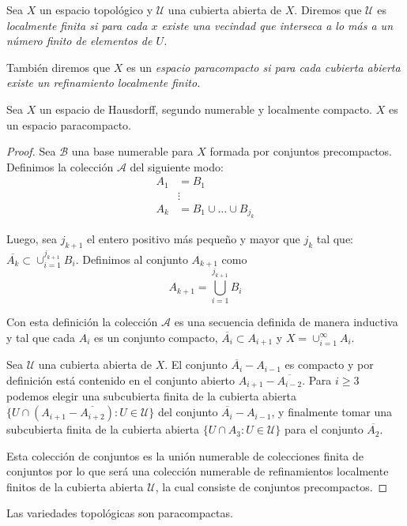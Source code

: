 \begin{definition}
  Sea $X$ un espacio topológico y $\mathcal{U}$ una cubierta abierta de $X$. Diremos que $\mathcal{U}$  es \it{localmente finita} si para cada $x$ existe una vecindad que interseca a lo más a un número finito de elementos de $U$.

  También diremos que $X$ es un \it{espacio paracompacto} si para cada cubierta abierta existe un refinamiento localmente finito. 
\end{definition}

\begin{theorem}  \label{Teorema: Espacios Precompactos}
 Sea $X$ un espacio de Hausdorff, segundo numerable y localmente compacto. $X$ es un espacio paracompacto.
\end{theorem}

\begin{proof}
  Sea $\mathcal{B}$ una base numerable para $X$ formada por conjuntos precompactos. Definimos la colección $\mathcal{A}$ del siguiente modo:
  \begin{align*}
    A_1 &= B_1\\
    &\vdots\\
    A_k &= B_1 \cup \dots \cup B_{j_k}
  \end{align*}

  Luego, sea $j_{k+1}$ el entero positivo más pequeño y mayor que $j_k$ tal que: $\overline{A_k} \subset \cup_{i=1}^{j_{k+1}} B_i$. Definimos al conjunto $A_{k+1}$ como
  \[
    A_{k+1} = \bigcup_{i=1}^{j_{k+1}} B_i
  \]

  Con esta definición la colección $\mathcal{A}$ es una secuencia definida de manera inductiva y tal que cada $A_i$ es un conjunto compacto, $\overline{A_i} \subset A_{i+1}$ y $X = \cup_{i=1}^{\infty} A_i$.

  Sea $\mathcal{U}$ una cubierta abierta de $X$. El conjunto $\overline{A_i} - A_{i-1}$ es compacto y por definición está contenido en el conjunto abierto $A_{i+1} - \overline{A_{i-2}}$. Para $i \geq 3$ podemos elegir una subcubierta finita de la cubierta abierta $\{U \cap (A_{i+1} - \overline{A_{i+2}}) : U \in \mathcal{U} \}$ del conjunto $\overline{A_{i}} - A_{i-1}$, y finalmente tomar una subcubierta finita de la cubierta abierta $\{U \cap A_3: U \in \mathcal{U}\}$ para el conjunto $\overline{A_2}$.

Esta colección de conjuntos es la unión numerable de colecciones finita de conjuntos por lo que será una colección numerable de refinamientos localmente finitos de la cubierta abierta $\mathcal{U}$, la cual consiste de conjuntos precompactos.
\end{proof}

\begin{corollary} \label{Corolario: Variedades Precompactas}
  Las variedades topológicas son paracompactas.
\end{corollary}
